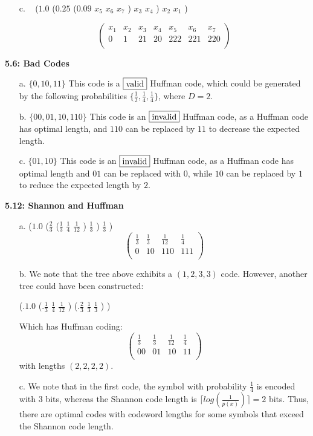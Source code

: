 \documentclass[10pt]{article}
\begin{document}
\begin{tiny}
\begin{multicols}{3}
\begin{itemize}
	\item[c.] 
\
($1.0$  ($0.25$ ($0.09$ $x_5$ $x_6$ $x_7$ ) $x_3$ $x_4$ ) $x_2$ $x_1$ )

\[
 \begin{pmatrix}
	x_1 & x_2 & x_3 & x_4 & x_5 & x_6 & x_7 \\
	0   & 1   & 21  & 20  & 222 & 221 & 220 \\
 \end{pmatrix}
\]
\end{itemize}

\textbf{5.6: Bad Codes}

\begin{itemize}
	\item[a.] $ \{0, 10, 11 \} $ This code is a $\fbox{valid}$ Huffman code, which could be generated by the following probabilities $\{ \frac{1}{2}, \frac{1}{4}, \frac{1}{4} \}$, where $D=2$.
	\item[b.] $ \{00, 01, 10, 110 \} $ This code is an $\fbox{invalid}$ Huffman code, as a Huffman code has optimal length, and $110$ can be replaced by $11$ to decrease the expected length.  
	\item[c.] $ \{01, 10 \} $ This code is an $\fbox{invalid}$ Huffman code, as a Huffman code has optimal length and $01$ can be replaced with $0$, while $10$ can be replaced by $1$ to reduce the expected length by $2$.
\end{itemize}

\textbf{5.12: Shannon and Huffman}
\begin{itemize}
	\item[a.]
($1.0$ ($\frac{2}{3}$ ($\frac{1}{3}$ $\frac{1}{4}$ $\frac{1}{12}$ ) $\frac{1}{3}$ ) $\frac{1}{3}$ )
\[
 \begin{pmatrix}
	\frac{1}{3} & \frac{1}{3} & \frac{1}{12} & \frac{1}{4}\\
	0           &  10         & 110          & 111\\
 \end{pmatrix}
\]
	\item[b.] We note that the tree above exhibits a $(1,2,3,3)$ code. However, another tree could have been constructed: 

(.$1.0$ (.$\frac{1}{3}$ $\frac{1}{4}$ $\frac{1}{12}$ ) (.$\frac{2}{3}$ $\frac{1}{3}$ $\frac{1}{3}$ ) ) 

Which has Huffman coding:
\[
 \begin{pmatrix}
	\frac{1}{3} & \frac{1}{3} & \frac{1}{12} & \frac{1}{4}\\
	00           &  01         & 10          & 11\\
 \end{pmatrix}
\] with lengths $(2, 2, 2, 2)$.
	\item[c.] We note that in the first code, the symbol with probability $\frac{1}{4}$ is encoded with $3$ bits, whereas the Shannon code length is $\lceil log(\frac{1}{p(x)}) \rceil = 2$ bits. Thus, there are optimal codes with codeword lengths for some symbols that exceed the Shannon code length.
\end{itemize}


\end{multicols}
\end{tiny}
\end{document}
